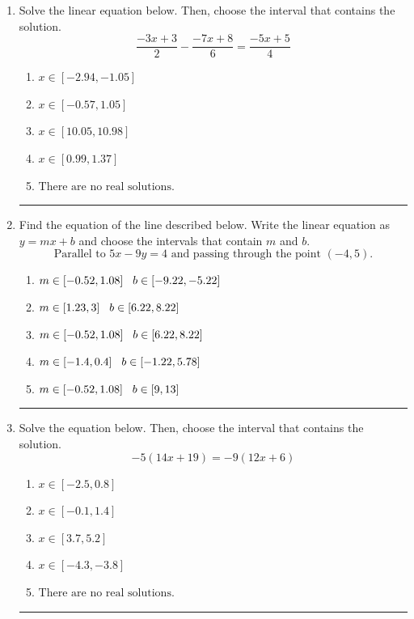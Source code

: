 \documentclass[14pt]{extbook}
\newcommand{\litem}[1]{\item#1\hspace*{-1cm}\rule{\textwidth}{0.4pt}}
\begin{document}
\begin{enumerate}
{\begin{enumerate}[label=\Alph*.]
\end{enumerate} }
\litem{
Solve the linear equation below. Then, choose the interval that contains the solution.\[ \frac{-3x + 3}{2} - \frac{-7x + 8}{6} = \frac{-5x + 5}{4} \]\begin{enumerate}[label=\Alph*.]
\item \( x \in [-2.94, -1.05] \)
\item \( x \in [-0.57, 1.05] \)
\item \( x \in [10.05, 10.98] \)
\item \( x \in [0.99, 1.37] \)
\item \( \text{There are no real solutions.} \)

\end{enumerate} }
\litem{
Find the equation of the line described below. Write the linear equation as $ y=mx+b $ and choose the intervals that contain $m$ and $b$.\[ \text{Parallel to } 5 x - 9 y = 4 \text{ and passing through the point } (-4, 5). \]\begin{enumerate}[label=\Alph*.]
\item \( m \in [-0.52, 1.08] \hspace*{3mm} b \in [-9.22, -5.22] \)
\item \( m \in [1.23, 3] \hspace*{3mm} b \in [6.22, 8.22] \)
\item \( m \in [-0.52, 1.08] \hspace*{3mm} b \in [6.22, 8.22] \)
\item \( m \in [-1.4, 0.4] \hspace*{3mm} b \in [-1.22, 5.78] \)
\item \( m \in [-0.52, 1.08] \hspace*{3mm} b \in [9, 13] \)

\end{enumerate} }
\litem{
Solve the equation below. Then, choose the interval that contains the solution.\[ -5(14x + 19) = -9(12x + 6) \]\begin{enumerate}[label=\Alph*.]
\item \( x \in [-2.5, 0.8] \)
\item \( x \in [-0.1, 1.4] \)
\item \( x \in [3.7, 5.2] \)
\item \( x \in [-4.3, -3.8] \)
\item \( \text{There are no real solutions.} \)


\end{enumerate}}
\end{enumerate}
\end{document}
